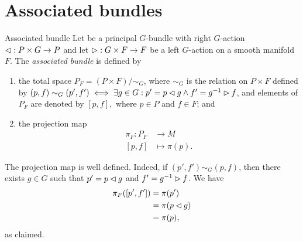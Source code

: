 \section{Associated bundles}

\begin{definition}{Associated bundle}{}
    Let  be a principal \(G\)-bundle with right \(G\)-action \(\mathbin{\vartriangleleft} : P \times G \to P\) and let \(\mathbin{\vartriangleright} : G \times F \to F\) be a left \(G\)-action on a smooth manifold \(F\). The \emph{associated bundle}  is defined by
    \begin{enumerate}[label=(\alph*)]
        \item the total space \(P_F = (P \times F) / \sim_G\), where \(\sim_G\) is the relation on \(P \times F\) defined by \((p, f) \sim_G (p', f') \iff \exists g \in G : p' = p \mathbin{\vartriangleleft} g \land f' = g^{-1} \mathbin{\vartriangleright} f\), and elements of \(P_F\) are denoted by \([p,f],\) where \(p \in P\) and \(f \in F\); and
        \item the projection map
            \begin{align*}
                \pi_F : P_F &\to M\\
                      [p,f] &\mapsto \pi(p).
            \end{align*}
    \end{enumerate}
\end{definition}
\begin{remark}
    The projection map is well defined. Indeed, if \((p', f') \sim_G (p, f)\), then there exists \(g\in G\) such that \(p' = p \mathbin{\vartriangleleft} g\) and \(f' = g^{-1} \mathbin{\vartriangleright} f\). We have
    \begin{align*}
        \pi_F([p', f']) &= \pi(p')\\
                        &= \pi(p \mathbin{\vartriangleleft} g)\\
                        &= \pi(p),
    \end{align*}
    as claimed.
\end{remark}

